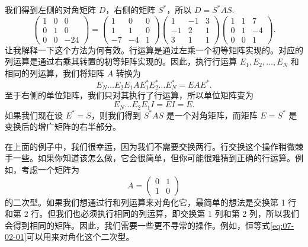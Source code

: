 我们得到左侧的对角矩阵 $D$，右侧的矩阵 $S^*$，所以 $D = S^*AS$.~
$$\begin{pmatrix} 1 & 0 & 0 \\ 0 & 1 & 0 \\ 0 & 0 & -24 \end{pmatrix} =
\begin{pmatrix} 1 & 0 & 0 \\ 1 & 1 & 0 \\ -7 & -4 & 1 \end{pmatrix}
\begin{pmatrix} 1 & -1 & 3 \\ -1 & 2 & 1 \\ 3 & 1 & 1 \end{pmatrix}
\begin{pmatrix} 1 & 1 & 7 \\ 0 & 1 & -4 \\ 0 & 0 & 1 \end{pmatrix}.
$$
让我解释一下这个方法为何有效。行运算是通过左乘一个初等矩阵实现的。对应的列运算是通过右乘其转置的初等矩阵实现的。因此，执行行运算 $E_1, E_2, \dots, E_N$ 和相同的列运算，我们将矩阵 $A$ 转换为
\begin{equation}\label{eq:07-02-02}
E_N \dots E_2 E_1 A E_1^* E_2^* \dots E_N^* = EAE^*.
\end{equation}
至于右侧的单位矩阵，我们只对其执行了行运算，所以单位矩阵变为
$$E_N \dots E_2 E_1 I = EI = E.$$
如果我们现在设 $E^* = S$，则我们得到 $S^*AS$ 是一个对角矩阵，而矩阵 $E = S^*$ 是变换后的增广矩阵的右半部分。

在上面的例子中，我们很幸运，因为我们不需要交换两行。行交换这个操作稍微棘手一些。如果你知道该怎么做，它会很简单，但你可能很难猜到正确的行运算。例如，考虑一个矩阵为
$$A = \begin{pmatrix} 0 & 1 \\ 1 & 0 \end{pmatrix}$$
的二次型。如果我们想通过行和列运算来对角化它，最简单的想法是交换第 1 行和第 2 行。但我们也必须执行相同的列运算，即交换第 1 列和第 2 列，所以我们会得到相同的矩阵。因此，我们需要一些更不寻常的操作。例如，恒等式\eqref{eq:07-02-01}可以用来对角化这个二次型。

